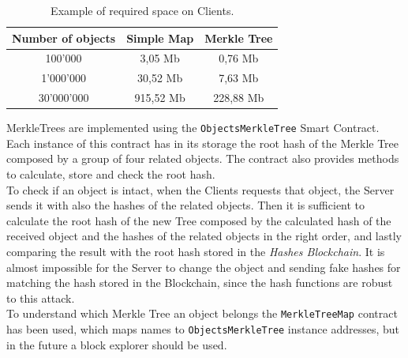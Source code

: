 \documentclass[hidelinks,conference,compsoc]{IEEEtran}
\begin{document}
\begin{table}[!h]
	\renewcommand{\arraystretch}{1.3}
	\caption{Example of required space on Clients.}
	\label{table_space}
	\centering
	\begin{tabular}{|c|c|c|}
	\hline
	\textbf{Number of objects} & \textbf{Simple Map} & \textbf{Merkle Tree}\\
	\hline
	\hline
	100'000 & 3,05 Mb & 0,76 Mb\\
	\hline
	1'000'000 & 30,52 Mb & 7,63 Mb \\
	\hline
	30'000'000 & 915,52 Mb & 228,88 Mb\\
	\hline
	\end{tabular}
\end{table}

MerkleTrees are implemented using the \texttt{ObjectsMerkleTree} Smart Contract.
Each instance of this contract has in its storage the root hash of the Merkle Tree composed by a group of four related objects. The contract also provides methods to calculate, store and check the root hash.\\
To check if an object is intact, when the Clients requests that object, the Server sends it with also the hashes of the related objects. Then it is sufficient to calculate the root hash of the new Tree composed by the calculated hash of the received object and the hashes of the related objects in the right order, and lastly comparing the result with the root hash stored in the \textit{Hashes Blockchain}. It is almost impossible for the Server to change the object and sending fake hashes for matching the hash stored in the Blockchain, since the hash functions are robust to this attack.\\
To understand which Merkle Tree an object belongs the \texttt{MerkleTreeMap} contract has been used, which maps names to \texttt{ObjectsMerkleTree} instance addresses, but in the future a block explorer should be used. 
\end{document}
